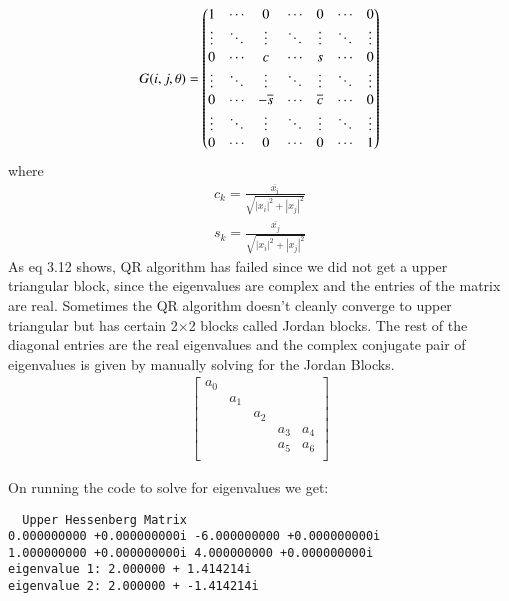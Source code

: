 \documentclass[journal]{IEEEtran}
\begin{document}
\begin{align}
G(i, j, \theta) =
\begin{pmatrix}
  1 & \cdots & 0 & \cdots & 0 & \cdots & 0 \\
  \vdots & \ddots & \vdots & \ddots & \vdots & \ddots & \vdots \\
  0 & \cdots & c & \cdots & s & \cdots & 0 \\
  \vdots & \ddots & \vdots & \ddots & \vdots & \ddots & \vdots \\
  0 & \cdots & -\overline{s} & \cdots & \overline{c} & \cdots & 0 \\
  \vdots & \ddots & \vdots & \ddots & \vdots & \ddots & \vdots \\
  0 & \cdots & 0 & \cdots & 0 & \cdots & 1
  \end{pmatrix}
\end{align}
  where 
\begin{align}
    c_k = \frac{\overline{x_i}}{\sqrt{|x_i|^2 + |x_j|^2}}\\
    s_k = \frac{\overline{x_j}}{\sqrt{|x_i|^2 + |x_j|^2}}   
\end{align}
As eq 3.12 shows, QR algorithm has failed since we did not get a upper triangular block, since the
eigenvalues are complex and the entries of the matrix are real.
\newline
Sometimes the QR algorithm doesn't cleanly converge to upper triangular but has  certain 2$\times$2 blocks
called Jordan blocks. The rest of the diagonal entries are the real eigenvalues and the complex 
conjugate pair of eigenvalues is given by manually solving for the Jordan Blocks.
\begin{align}
    \begin{bmatrix}
        a_0 & & & &  \\
         & a_1 & & &  \\
         & & a_2 & & \\
         & &  & a_3 &a_4\\
         & & & a_5& a_6\\
    \end{bmatrix}
\end{align}

On running the code to solve for eigenvalues we get:
\begin{verbatim}
  Upper Hessenberg Matrix
0.000000000 +0.000000000i -6.000000000 +0.000000000i 
1.000000000 +0.000000000i 4.000000000 +0.000000000i 
eigenvalue 1: 2.000000 + 1.414214i
eigenvalue 2: 2.000000 + -1.414214i
\end{verbatim}
\end{document}
